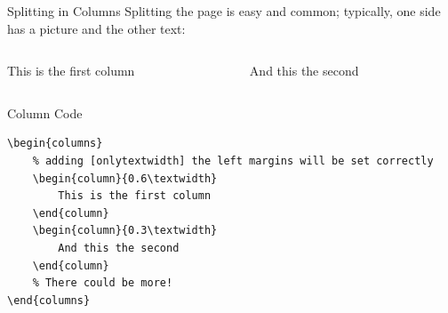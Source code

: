 \begin{frame}[fragile]{Splitting in Columns}
Splitting the page is easy and common; typically, one side has a picture and the other text:
\begin{columns}  %
\begin{column}{0.6\textwidth}
This is the first column
\end{column}
\begin{column}{0.3\textwidth}
And this the second
\end{column}
\end{columns}
\begin{block}{Column Code}
\begin{verbatim}
\begin{columns} 
    % adding [onlytextwidth] the left margins will be set correctly
    \begin{column}{0.6\textwidth}
        This is the first column
    \end{column}
    \begin{column}{0.3\textwidth}
        And this the second
    \end{column}
    % There could be more!
\end{columns}
\end{verbatim}
\end{block}

\end{frame}
